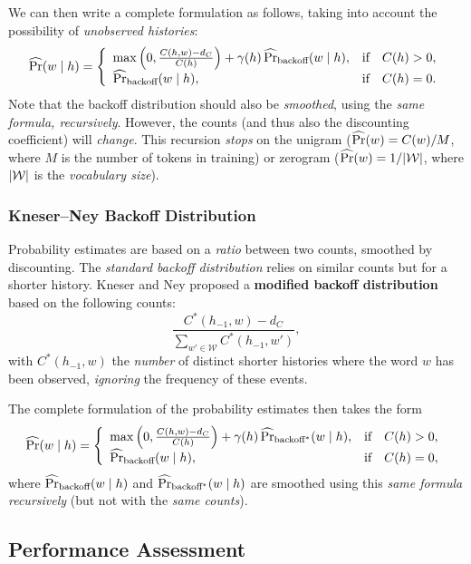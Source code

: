 We can then write a complete formulation as follows, taking into account the possibility of \emph{unobserved histories}:
\[
\Prhat(w \mid h) = \left\{\begin{array}{l@{\quad}l}
\max\left(0, \frac{C(h, w) - d_C}{C(h)}\right) + \gamma(h)\Prhat_{\textnormal{backoff}}(w \mid h), & \textnormal{if} \quad C(h) > 0,\\
\Prhat_{\textnormal{backoff}}(w \mid h), & \textnormal{if} \quad C(h) = 0.
\end{array}\right.
\]
Note that the backoff distribution should also be \emph{smoothed}, using the \emph{same formula, recursively}.
However, the counts (and thus also the discounting coefficient) will \emph{change}.
This recursion \emph{stops} on the unigram (\(\operatorname{\widehat{\Pr}}(w) = C(w) / M\), where \(M\) is the number of tokens in training) or zerogram (\(\operatorname{\widehat{\Pr}}(w) = 1/{\left\lvert\mathcal{W}\right\lvert}\), where \({\left\lvert\mathcal{W}\right\lvert}\) is the \emph{vocabulary size}).

\subsubsection{Kneser--Ney Backoff Distribution}
Probability estimates are based on a \emph{ratio} between two counts, smoothed by discounting.
The \emph{standard backoff distribution} relies on similar counts but for a shorter history.
Kneser and Ney proposed a \textbf{modified backoff distribution} based on the following counts:
\[
\frac{C^*(h_{-1}, w) - d_C}{\sum_{w' \in \mathcal{W}} C^*(h_{-1}, w')},
\]
with \(C^*(h_{-1}, w)\) the \emph{number} of distinct shorter histories where the word \(w\) has been observed, \emph{ignoring} the frequency of these events.

The complete formulation of the probability estimates then takes the form
\[
\Prhat(w \mid h) = \left\{\begin{array}{l@{\quad}l}
\max\left(0, \frac{C(h, w) - d_C}{C(h)}\right) + \gamma(h)\Prhat_{\textnormal{backoff}^*}(w \mid h), & \textnormal{if} \quad C(h) > 0,\\
\Prhat_{\textnormal{backoff}}(w \mid h), & \textnormal{if} \quad C(h) = 0,
\end{array}\right.
\]
where \(\operatorname{\widehat{\Pr}}_{\textnormal{backoff}}(w \mid h)\) and \(\operatorname{\widehat{\Pr}}_{\textnormal{backoff}^*}(w \mid h)\) are smoothed using this \emph{same formula recursively} (but not with the \emph{same counts}).

\subsection{Performance Assessment}
